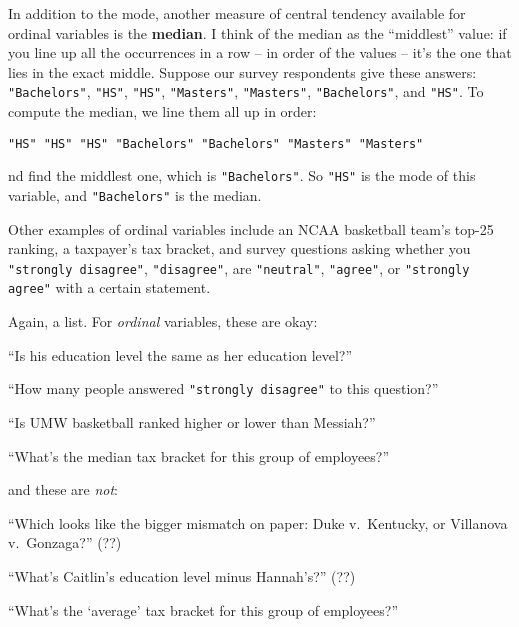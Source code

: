 In addition to the mode, another measure of central tendency available for
ordinal variables is the \textbf{median}. I think of the median as the
``middlest'' value: if you line up all the occurrences in a row -- in order of
the values -- it's the one that lies in the exact middle. Suppose our survey
respondents give these answers: \texttt{"Bachelors"}, \texttt{"HS"},
\texttt{"HS"}, \texttt{"Masters"}, \texttt{"Masters"}, \texttt{"Bachelors"},
and \texttt{"HS"}. To compute the median, we line them all up in order:

\begin{center}
\texttt{"HS"  "HS"  "HS"  "Bachelors"  "Bachelors"  "Masters"  "Masters"}
\end{center}

nd find the middlest one, which is \texttt{"Bachelors"}. So \texttt{"HS"} is
the mode of this variable, and \texttt{"Bachelors"} is the median.

Other examples of ordinal variables include an NCAA basketball team's top-25
ranking, a taxpayer's tax bracket, and survey questions asking whether you
\texttt{"strongly disagree"}, \texttt{"disagree"}, are \texttt{"neutral"},
\texttt{"agree"}, or \texttt{"strongly agree"} with a certain statement.

Again, a list. For \textit{ordinal} variables, these are okay:

\begin{compactitem}
\item[\leftthumbsup] ``Is his education level the same as her education level?''
\item[\leftthumbsup] ``How many people answered \texttt{"strongly disagree"} to
this question?''
\item[\leftthumbsup] ``Is UMW basketball ranked higher or lower than Messiah?''
\item[\leftthumbsup] ``What's the median tax bracket for this group of
employees?''
\end{compactitem}

and these are \textit{not}:

\begin{compactitem}
\item[\leftthumbsdown] ``Which looks like the bigger mismatch on paper: Duke
v.~Kentucky, or Villanova v.~Gonzaga?'' (??)
\item[\leftthumbsdown] ``What's Caitlin's education level minus Hannah's?'' (??)
\item[\leftthumbsdown] ``What's the `average' tax bracket for this group of
employees?''
\end{compactitem}

